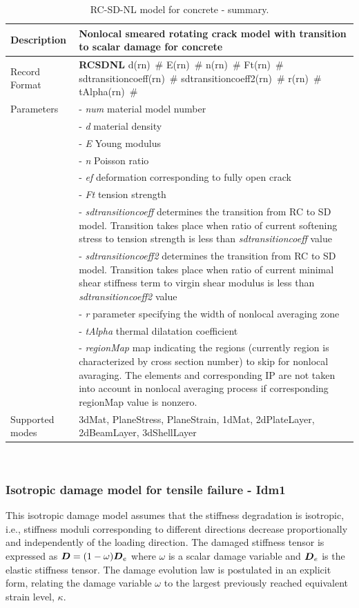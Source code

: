 \documentclass[a4paper]{article}
\newcommand{\mbf}[1]{\mbox{\boldmath$#1$}}
\newcommand{\descitem}[1]{{\noindent \bf #1}}
\newcommand{\elemparam}[2]{{{#1\tiny (#2)}~\#}}
\newcommand{\param}[1]{{\it #1}}
\newenvironment{mmt}{\begin{tabular}{|l|p{9cm}|}}{\end{tabular}\\}
\newenvironment{mmt}{\begin{tabular}{|l|l|}}{\end{tabular}\\}
\begin{document}
\begin{table}[!htb]
\begin{mmt}
\hline
Description & Nonlocal smeared rotating crack model with transition to scalar damage for concrete\\
\hline
Record Format & \descitem{RCSDNL} \elemparam{d}{rn} \elemparam{E}{rn}
\elemparam{n}{rn}  \elemparam{Ft}{rn}
\elemparam{sdtransitioncoeff}{rn} \elemparam{sdtransitioncoeff2}{rn}
\elemparam{r}{rn} \elemparam{tAlpha}{rn} \\
Parameters &- \param{num} material model number\\
&- \param{d} material density\\
&- \param{E} Young modulus\\
&- \param{n} Poisson ratio\\
&- \param{ef} deformation corresponding to fully open crack\\
&- \param{Ft} tension strength\\
&- \param{sdtransitioncoeff} determines the transition from RC to SD
model. Transition takes place when ratio of current softening
stress to tension strength is less than  \param{sdtransitioncoeff} value\\
&- \param{sdtransitioncoeff2} determines the transition from RC to SD
model. Transition takes place when ratio of current minimal shear
stiffness term to virgin shear modulus is less than  \param{sdtransitioncoeff2} value\\
&- \param{r} parameter specifying the width of nonlocal averaging zone\\
&- \param{tAlpha} thermal dilatation coefficient\\
&- \param{regionMap} map indicating the regions (currently region is
characterized by cross section number) to skip for nonlocal
avaraging. The elements and corresponding IP are not taken into
account in nonlocal averaging process if corresponding regionMap
value is nonzero.\\
Supported modes& 3dMat, PlaneStress, PlaneStrain, 1dMat,
2dPlateLayer, 2dBeamLayer, 3dShellLayer\\
\hline
\end{mmt}
\caption{RC-SD-NL model for  concrete - summary.}
\label{rcsdnl_table}
\end{table}



\subsubsection{Isotropic damage model for tensile failure - Idm1}
\label{sec:idmtf}
This isotropic damage model assumes that the stiffness degradation is
isotropic, i.e., stiffness moduli corresponding to different
directions decrease proportionally and independently of the loading 
direction. The damaged stiffness tensor is expressed as
$\mbf{D}=(1-\omega)\mbf{D}_e$ where $\omega$ is a scalar damage variable
and $\mbf{D}_e$ is the elastic stiffness tensor.
The damage evolution law is postulated in an explicit form, relating
the damage variable $\omega$ to the largest previously reached 
equivalent strain level, $\kappa$.
\end{document}
